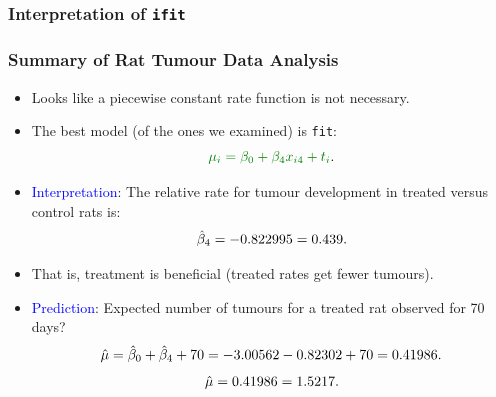 \documentclass[oneside]{book}\usepackage[]{graphicx}\usepackage[svgnames]{xcolor}
\makeatletter
\newcommand{\hlnum}[1]{\textcolor[rgb]{0.686,0.059,0.569}{#1}}%
\newcommand{\hlopt}[1]{\textcolor[rgb]{0,0,0}{#1}}%
\newcommand{\hlstd}[1]{\textcolor[rgb]{0.345,0.345,0.345}{#1}}%
\newcommand{\hlkwd}[1]{\textcolor[rgb]{0.737,0.353,0.396}{\textbf{#1}}}%
\newenvironment{kframe}{%
 \def\at@end@of@kframe{}%
 \ifinner\ifhmode%
  \def\at@end@of@kframe{\end{minipage}}%
  \begin{minipage}{\columnwidth}%
 \fi\fi%
 \def\FrameCommand##1{\hskip\@totalleftmargin \hskip-\fboxsep
 \colorbox{shadecolor}{##1}\hskip-\fboxsep
     \hskip-\linewidth \hskip-\@totalleftmargin \hskip\columnwidth}%
 \MakeFramed {\advance\hsize-\width
   \@totalleftmargin\z@ \linewidth\hsize
   \@setminipage}}%
 {\par\unskip\endMakeFramed%
 \at@end@of@kframe}
\newenvironment{knitrout}{}{} %
\let\exp\relax%
\let\log\relax%
\newcommand{\HN}{\textsl{H}_{\textsl{0}}}%
\makeatother
\begin{document}
\subsubsection*{Interpretation of \texttt{ifit}}
\subsubsection*{Summary of Rat Tumour Data Analysis}
\begin{itemize}
    \item Looks like a piecewise constant rate function is not necessary.
    \item The best model (of the ones we examined) is \texttt{fit}:
          \[ \textcolor{Green}{\log{\mu_i}=\beta_0+\beta_4x_{i4}+\log{t_i}}. \]
    \item \textcolor{Blue}{Interpretation}: The relative rate for tumour development in treated versus control
          rats is:
          \[ \exp{\hat{\beta}_4}=\exp{-0.822995}=0.439. \]
    \item That is, treatment is beneficial (treated rates get fewer tumours).
    \item \textcolor{Blue}{Prediction}: Expected number of tumours for a treated rat observed for 70 days?
          \[ \log{\hat{\mu}}=\hat{\beta}_0+\hat{\beta}_4+\log{70}=-3.00562-0.82302+\log{70}=0.41986. \]
          \[ \hat{\mu}=\exp{0.41986}=1.5217. \]
\end{itemize}
\end{document}
